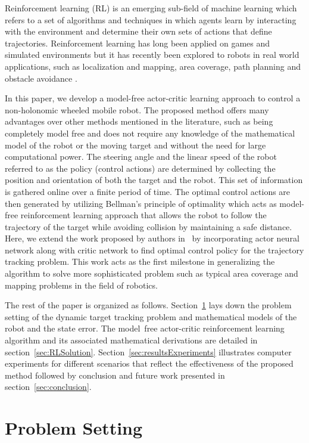\documentclass[conference]{IEEEtran}
\begin{document}
Reinforcement learning (RL) is an emerging sub-field of machine learning which
refers to a set of algorithms and techniques in which agents learn by
interacting with the environment and determine their own sets of actions that
define trajectories. Reinforcement learning has long been applied on games and
simulated environments but it has recently been explored to robots in real world
applications, such as localization and mapping, area coverage, path planning and
obstacle avoidance
\cite{kober2013reinforcement,smart2002,michels2005,adekunle2016}.

In this paper, we develop a model-free actor-critic learning approach to control
a non-holonomic wheeled mobile robot. The proposed method offers many advantages
over other methods mentioned in the literature, such as being completely model
free and does not require any knowledge of the mathematical model of the robot
or the moving target and without the need for large computational power. The
steering angle and the linear speed of the robot referred to as the policy
(control actions) are determined by collecting the position and orientation of
both the target and the robot. This set of information is gathered online over a
finite period of time. The optimal control actions are then generated by
utilizing Bellman's principle of optimality which acts as model-free reinforcement learning approach that allows the robot to follow the
trajectory of the target while avoiding collision by maintaining a safe
distance. Here, we extend the work proposed by authors in~\cite{miah2020} by
incorporating actor neural network along with critic network to find optimal
control policy for the trajectory tracking problem. This work acts as the first
milestone in generalizing the algorithm to solve more sophisticated problem such
as typical area coverage and mapping problems in the field of robotics.

The rest of the paper is organized as follows. Section~\ref{sec:problemSetting}
lays down the problem setting of the dynamic target tracking problem and
mathematical models of the robot and the state error. The model~free
actor-critic reinforcement learning algorithm and its associated  mathematical
derivations are detailed in section~\ref{sec:RLSolution}.
Section~\ref{sec:resultsExperiments} illustrates computer experiments for different scenarios that reflect the effectiveness of the proposed method followed by conclusion and future work presented in section~\ref{sec:conclusion}.      

\section{Problem Setting} 
\label{sec:problemSetting}
\end{document}
